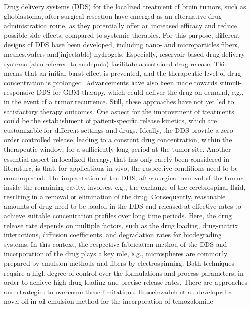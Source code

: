 Drug delivery systems (DDS) for the localized treatment of brain tumors, such as glioblastoma, after surgical resection have emerged as an alternative drug administration route, as they potentially offer an increased efficacy and reduce possible side effects, compared to systemic therapies\supercite{de2010polymeric,pena2021design,wait2015polymeric,guerin2004recent,brem1991interstitial,li2020nanoparticle,tseng2021role,bastiancich2021rationally}. For this purpose, different designs of DDS have been developed, including nano- and microparticles\supercite{jain2016surface,gonzalez2015controlled,menei2004stereotaxic,bhaskaran2020current} fibers\supercite{norouzi2018salinomycin,fonseca2022electrospun}, meshes\supercite{han2019multi,di2021conformable},wafers\supercite{mcgirt2009gliadel,westphal2003phase} and(injectable) hydrogels\supercite{kang2021temperature,bastiancich2016anticancer}. Especially, reservoir-based drug delivery systems (also referred to as depots) facilitate a sustained drug release\supercite{wang2020electrospun,brudno2018replenishable}. This means that an initial burst effect is prevented, and the therapeutic level of drug concentration is prolonged\supercite{yu2022strategies}. Advancements have also been made towards stimuli-responsive DDS\supercite{graham2020tumor,lee2019flexible,wang2022silk} for GBM therapy, which could deliver the drug on-demand, e.g., in the event of a tumor recurrence. Still, these approaches have not yet led to satisfactory therapy outcomes. One aspect for the improvement of treatments could be the establishment of patient-specific release kinetics, which are customizable for different settings and drugs. Ideally, the DDS provide a zero-order controlled release, leading to a constant drug concentration, within the therapeutic window, for a sufficiently long period at the tumor site\supercite{fenton2018advances}. Another essential aspect in localized therapy, that has only rarely been considered in literature, is that, for applications in vivo, the respective conditions need to be contemplated. The implantation of the DDS, after surgical removal of the tumor, inside the remaining cavity, involves, e.g., the exchange of the cerebrospinal fluid\supercite{sweetman2011cerebrospinal,straehla2020pharmacokinetic}, resulting in a removal or elimination of the drug. Consequently, reasonable amounts of drug need to be loaded in the DDS and released at effective rates to achieve suitable concentration profiles over long time periods. Here, the drug release rate depends on multiple factors, such as the drug loading, drug-matrix interactions, diffusion coefficients, and degradation rates for biodegrading systems\supercite{stewart2018implantable}. In this context, the respective fabrication method of the DDS and incorporation of the drug plays a key role, e.g., microspheres are commonly prepared by emulsion methods\supercite{floyd2015drug} and fibers by electrospinning\supercite{chen2018emerging}. Both techniques require a high degree of control over the formulations and process parameters, in order to achieve high drug loading and precise release rates. There are approaches and strategies to overcome these limitations. Hosseinzadeh et al.\supercite{hosseinzadeh2019drug} developed a novel oil-in-oil emulsion method for the incorporation of temozolomide 